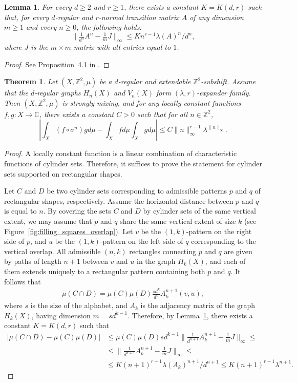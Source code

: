 \documentclass[12pt]{article}
\newtheorem{lemma}{Lemma}
\newtheorem{theorem}{Theorem}
\theoremstyle{definition}
\begin{document}
\begin{lemma}\label{lem:constant_C(d,r)}
For every $d\geq 2$ and $r\geq 1$, there exists a constant $K=K(d,r)$ such that, for every $d$-regular and  $r$-normal transition matrix $A$ of any dimension $m\geq 1$ and every $n\geq 0$, the following holds:
\[
\|\tfrac{1}{d^{n}}A^n-\tfrac{1}{m}J\|_{\infty} \leq Kn^{r-1}\lambda(A)^{n}/d^{n},
\]
where $J$ is the $m\times m$ matrix with all entries equal to $1$.
\end{lemma}
\begin{proof}
See Proposition~4.1 in \cite{Parzanchevski2020}.
\end{proof}

\begin{theorem}
Let $(X,\mathbb{Z}^2,\mu)$ be a $d$-regular and extendable $\mathbb{Z}^2$-subshift. Assume that the $d$-regular graphs $H_n(X)$ and $V_n(X)$ form $(\lambda,r)$-expander family. Then $(X,\mathbb{Z}^2,\mu)$ is strongly mixing, and for any locally constant functions $f,g:X\rightarrow\mathbb{C}$, there exists a constant $C>0$ such that for all $n\in\mathbb{Z}^2$,
\[
\left|\int_X (f\circ \sigma^n)gd\mu - \int_Xfd\mu\int_Xgd\mu\right|\leq C\|n\|_\infty^{r-1}\lambda^{\|n\|_\infty}.
\]
\end{theorem}
\begin{proof}
A locally constant function is a linear combination of characteristic functions of cylinder sets. Therefore, it suffices to prove the statement for cylinder sets supported on rectangular shapes.

Let $C$ and $D$ be two cylinder sets corresponding to admissible patterns $p$ and $q$ of rectangular shapes, respectively. Assume the horizontal distance between $p$ and $q$ is equal to $n$. By covering the sets $C$ and $D$ by cylinder sets of the same vertical extent, we may assume that $p$ and $q$ share the same vertical extent of size $k$ (see Figure~\ref{fig:filling_squares_overlap}). Let $v$ be the $(1,k)$-pattern on the right side of $p$, and $u$ be the $(1,k)$-pattern on the left side of $q$ corresponding to the vertical overlap.
All admissible $(n,k)$ rectangles connecting $p$ and $q$ are given by paths of length $n+1$ between $v$ and $u$ in the graph $H_k(X)$, and each of them extends uniquely to a rectangular pattern containing both $p$ and $q$.
It follows that
\begin{align*}
\mu(C\cap D)=\mu(C)\mu(D)\frac{sd^{k}}{d^{n}}A_k^{n+1}(v,u),
\end{align*}
where $s$ is the size of the alphabet, and $A_k$ is the adjacency matrix of the graph $H_k(X)$, having dimension $m=sd^{k-1}$. Therefore, by Lemma~\ref{lem:constant_C(d,r)}, there exists a constant $K=K(d,r)$ such that
\begin{align*}
\left|\mu(C\cap D)-\mu(C)\mu(D)\right|&\leq \mu(C)\mu(D)sd^{k-1}\|\tfrac{1}{d^{n+1}}A_k^{n+1}-\tfrac{1}{m}J\|_{\infty}  \leq \\ &\leq \|\tfrac{1}{d^{n+1}}A_k^{n+1}-\tfrac{1}{m}J\|_{\infty}\leq\\
&\leq K(n+1)^{r-1}\lambda(A_k)^{n+1}/d^{n+1} \leq K(n+1)^{r-1}\lambda^{n+1}.
\end{align*}
\end{proof}
\end{document}
